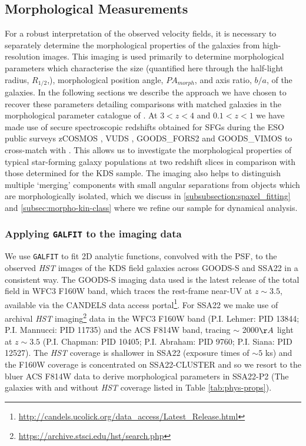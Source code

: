 \documentclass[fleqn,usenatbib]{mn2e}
\begin{document}
\subsection{Morphological Measurements}\label{subsec:morphological_measurements}
For a robust interpretation of the observed velocity fields, it is necessary to separately determine the morphological properties of the galaxies from high-resolution images.
This imaging is used primarily to determine morphological parameters which characterise the size (quantified here through the half-light radius, $R_{1/2}$,), morphological position angle, $PA_{morph}$, and axis ratio, $b/a$, of the galaxies. 
In the following sections we describe the approach we have chosen to recover these parameters detailing comparisons with matched galaxies in the morphological parameter catalogue of \cite{VanderWel2012}.
At $3 < z < 4$ and $0.1 < z < 1$ we have made use of secure spectroscopic redshifts obtained for SFGs during the ESO public surveys zCOSMOS \citep{Lilly2007}, VUDS \citep{Tasca2016}, GOODS\_FORS2 \citep{Vanzella2005,Vanzella2006,Vanzella2008} and GOODS\_VIMOS \citep{Balestra2010} to cross-match with \cite{VanderWel2012}.
This allows us to investigate the morphological properties of typical star-forming galaxy populations at two redshift slices in comparison with those determined for the KDS sample.
The imaging also helps to distinguish multiple `merging' components with small angular separations from objects which are morphologically isolated, which we discuss in \cref{subsubsection:spaxel_fitting} and \cref{subsec:morpho-kin-class} where we refine our sample for dynamical analysis.

\subsubsection{Applying {\tt GALFIT} to the imaging data}\label{subsubsec:galfitting}
We use {\tt GALFIT} \citep{Peng2010_galfit} to fit 2D analytic functions, convolved with the PSF, to the observed {\em HST} images of the KDS field galaxies across GOODS-S and SSA22 in a consistent way.
The GOODS-S imaging data used is the latest release of the total field in WFC3 F160W band, which traces the rest-frame near-UV at $z \sim 3.5$, available via the CANDELS \citep{Grogin2011,Koekemoer2011} data access portal\footnote{\url{http://candels.ucolick.org/data_access/Latest_Release.html}}.
For SSA22 we make use of archival {\em HST} imaging\footnote{\url{https://archive.stsci.edu/hst/search.php}} data in the WFC3 F160W band (P.I. Lehmer: PID 13844; P.I. Mannucci: PID 11735) and the ACS F814W band, tracing $\sim$ 2000$\AA$ light at $z\sim 3.5$ (P.I. Chapman: PID 10405; P.I. Abraham: PID 9760; P.I. Siana: PID 12527).
The {\em HST} coverage is shallower in SSA22 (exposure times of $\sim 5$ ks) and the F160W coverage is concentrated on SSA22-CLUSTER and so we resort to the bluer ACS F814W data to derive morphological parameters in SSA22-P2 (The galaxies with and without {\em HST} coverage listed in Table \ref{tab:phys-props}). \\
\end{document}
